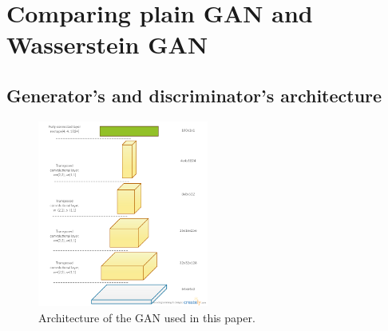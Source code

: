 \section{Comparing plain GAN and Wasserstein GAN}

\subsection{Generator's and discriminator's architecture}

\begin{figure}[h]
	\includegraphics[width=0.5\textwidth]{figures/arc_gen}
	\caption{Architecture of the GAN used in this paper.}
	\label{fig:gan_arc}
\end{figure}
